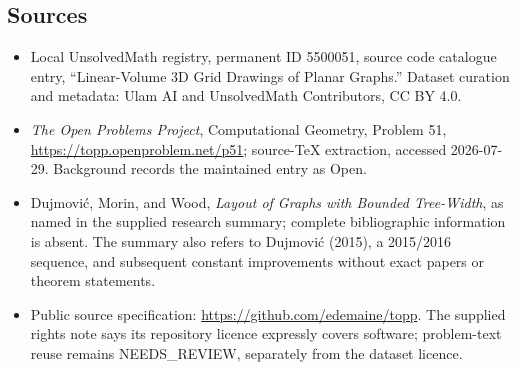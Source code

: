 \documentclass[11pt]{article}
\begin{document}
\subsection{Sources}
\begin{itemize}
\item Local UnsolvedMath registry, permanent ID 5500051, source code catalogue entry, ``Linear-Volume 3D Grid Drawings of Planar Graphs.'' Dataset curation and metadata: Ulam AI and UnsolvedMath Contributors, CC BY 4.0.
\item \emph{The Open Problems Project}, Computational Geometry, Problem 51, \url{https://topp.openproblem.net/p51}; source-TeX extraction, accessed 2026-07-29. Background records the maintained entry as Open.
\item Dujmović, Morin, and Wood, \emph{Layout of Graphs with Bounded Tree-Width}, as named in the supplied research summary; complete bibliographic information is absent. The summary also refers to Dujmović (2015), a 2015/2016 sequence, and subsequent constant improvements without exact papers or theorem statements.
\item Public source specification: \url{https://github.com/edemaine/topp}. The supplied rights note says its repository licence expressly covers software; problem-text reuse remains NEEDS\_REVIEW, separately from the dataset licence.
\end{itemize}
\end{document}
